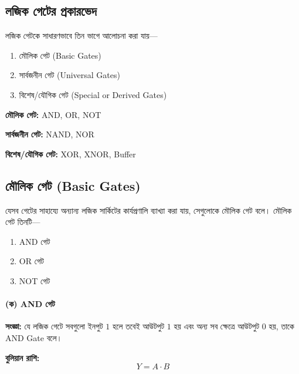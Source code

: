 \subsection{লজিক গেটের প্রকারভেদ}

লজিক গেটকে সাধারণভাবে তিন ভাগে আলোচনা করা যায়—

\begin{enumerate}
    \item মৌলিক গেট (\textenglish{Basic Gates})
    \item সার্বজনীন গেট (\textenglish{Universal Gates})
    \item বিশেষ/যৌগিক গেট (\textenglish{Special or Derived Gates})
\end{enumerate}

\textbf{মৌলিক গেট:} \textenglish{AND, OR, NOT}

\textbf{সার্বজনীন গেট:} \textenglish{NAND, NOR}

\textbf{বিশেষ/যৌগিক গেট:} \textenglish{XOR, XNOR, Buffer}


\subsection{মৌলিক গেট (\textenglish{Basic Gates})}

যেসব গেটের সাহায্যে অন্যান্য লজিক সার্কিটের কার্যপ্রণালি ব্যাখ্যা করা যায়, সেগুলোকে মৌলিক গেট বলে। মৌলিক গেট তিনটি—

\begin{enumerate}
    \item \textenglish{AND} গেট
    \item \textenglish{OR} গেট
    \item \textenglish{NOT} গেট
\end{enumerate}

\paragraph{(ক) \textenglish{AND} গেট}

\textbf{সংজ্ঞা:}
যে লজিক গেটে সবগুলো ইনপুট \(1\) হলে তবেই আউটপুট \(1\) হয় এবং অন্য সব ক্ষেত্রে আউটপুট \(0\) হয়, তাকে \textenglish{AND Gate} বলে।

\textbf{বুলিয়ান রাশি:}
\[
Y=A\cdot B
\]

